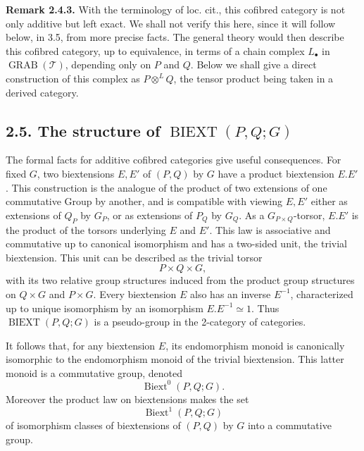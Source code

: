 \documentclass[11pt]{article}
\providecommand{\BIEXT}{\operatorname{BIEXT}}
\providecommand{\Biext}{\operatorname{Biext}}
\providecommand{\GRAB}{\operatorname{GRAB}}
\begin{document}
\textbf{Remark 2.4.3.}  With the terminology of loc. cit., this cofibred category is not only additive but left exact.  We shall not verify this here, since it will follow below, in 3.5, from more precise facts.  The general theory would then describe this cofibred category, up to equivalence, in terms of a chain complex \(L_\bullet\) in \(\GRAB(\mathcal T)\), depending only on \(P\) and \(Q\).  Below we shall give a direct construction of this complex as \(P\otimes^L Q\), the tensor product being taken in a derived category.

\subsection*{2.5. The structure of \(\BIEXT(P,Q;G)\)}
The formal facts for additive cofibred categories give useful consequences.  For fixed \(G\), two biextensions \(E,E'\) of \((P,Q)\) by \(G\) have a product biextension \(E.E'\).  This construction is the analogue of the product of two extensions of one commutative Group by another, and is compatible with viewing \(E,E'\) either as extensions of \(Q_P\) by \(G_P\), or as extensions of \(P_Q\) by \(G_Q\).  As a \(G_{P\times Q}\)-torsor, \(E.E'\) is the product of the torsors underlying \(E\) and \(E'\).  This law is associative and commutative up to canonical isomorphism and has a two-sided unit, the trivial biextension.  This unit can be described as the trivial torsor
\begin{equation}\tag{2.5.1.1}
  P\times Q\times G,
\end{equation}
with its two relative group structures induced from the product group structures on \(Q\times G\) and \(P\times G\).  Every biextension \(E\) also has an inverse \(E^{-1}\), characterized up to unique isomorphism by an isomorphism \(E.E^{-1}\simeq1\).  Thus \(\BIEXT(P,Q;G)\) is a pseudo-group in the 2-category of categories.

It follows that, for any biextension \(E\), its endomorphism monoid is canonically isomorphic to the endomorphism monoid of the trivial biextension.  This latter monoid is a commutative group, denoted
\begin{equation}\tag{2.5.2.1}
  \Biext^0(P,Q;G).
\end{equation}
Moreover the product law on biextensions makes the set
\begin{equation}\tag{2.5.2.2}
  \Biext^1(P,Q;G)
\end{equation}
of isomorphism classes of biextensions of \((P,Q)\) by \(G\) into a commutative group.
\end{document}
